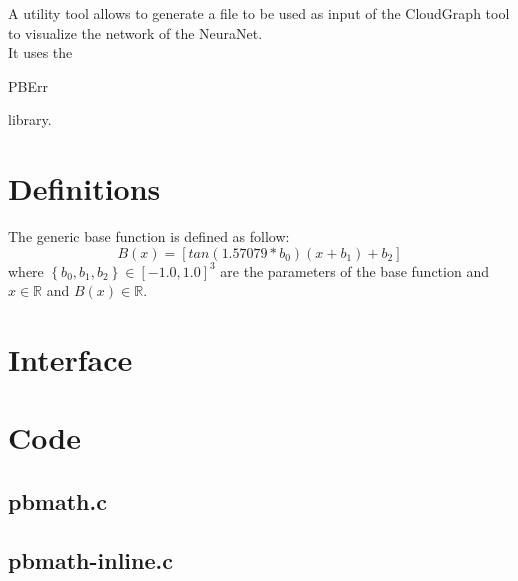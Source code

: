 A utility tool allows to generate a file to be used as input of the CloudGraph tool to visualize the network of the NeuraNet.\\

It uses the \begin{ttfamily}PBErr\end{ttfamily} library.\\

\section{Definitions}

The generic base function is defined as follow:\\
\begin{equation}
B(x)=\left[tan(1.57079*b_0)(x+b_1)+b_2\right]
\end{equation}
where $\left\lbrace b_0,b_1,b_2\right\rbrace\in[-1.0,1.0]^3$ are the parameters of the base function and $x\in\mathbb{R}$ and $B(x)\in\mathbb{R}$.

\section{Interface}

\begin{scriptsize}
\begin{ttfamily}

\end{ttfamily}
\end{scriptsize}

\section{Code}

\subsection{pbmath.c}

\begin{scriptsize}
\begin{ttfamily}

\end{ttfamily}
\end{scriptsize}

\subsection{pbmath-inline.c}

